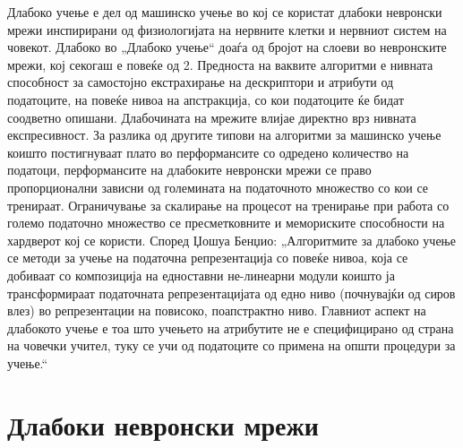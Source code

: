 Длабоко учење е дел од машинско учење во кој се користат длабоки невронски мрежи инспирирани од физиологијата на нервните клетки и нервниот систем на човекот. Длабоко во „Длабоко учење“ доаѓа од бројот на слоеви во невронските мрежи, кој секогаш е повеќе од 2. Предноста на ваквите алгоритми е нивната способност за самостојно екстрахирање на дескриптори и атрибути од податоците, на повеќе нивоа на апстракција, со кои податоците ќе бидат соодветно опишани. Длабочината на мрежите влијае директно врз нивната експресивност. За разлика од другите типови на алгоритми за машинско учење коишто постигнуваат плато во перформансите со одредено количество на податоци, перформансите на длабоките невронски мрежи се право пропорционални зависни од големината на податочното множество со кои се тренираат. Ограничување за скалирање на процесот на тренирање при работа со големо податочно множество се пресметковните и мемориските способности на хардверот кој се користи.
Според Џошуа Бенџио: „Алгоритмите за длабоко учење се методи за учење на податочна репрезентација со повеќе нивоа, која се добиваат со композиција на едноставни не-линеарни модули коишто ја трансформираат податочната репрезентацијата од едно ниво (почнувајќи од сиров влез) во репрезентации на повисоко, поапстрактно ниво. Главниот аспект на длабокото учење е тоа што учењето на атрибутите не е специфицирано од страна на човечки учител, туку се учи од податоците со примена на општи процедури за учење.“
 
\section{Длабоки невронски мрежи}

